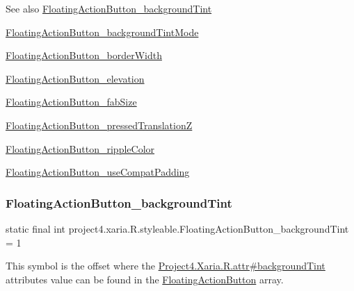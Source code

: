 \begin{DoxySeeAlso}{See also}
\hyperlink{classproject4_1_1xaria_1_1R_1_1styleable_ab51ba534c762989e0a01ee546e7b38ce}{Floating\+Action\+Button\+\_\+background\+Tint} 

\hyperlink{classproject4_1_1xaria_1_1R_1_1styleable_ad842e522e53bfbbcc8e47812cbc7d296}{Floating\+Action\+Button\+\_\+background\+Tint\+Mode} 

\hyperlink{classproject4_1_1xaria_1_1R_1_1styleable_a670df91ac65db7bb060f28a69c8c2ce1}{Floating\+Action\+Button\+\_\+border\+Width} 

\hyperlink{classproject4_1_1xaria_1_1R_1_1styleable_a1f212346344f0518ba9f7671202beaf7}{Floating\+Action\+Button\+\_\+elevation} 

\hyperlink{classproject4_1_1xaria_1_1R_1_1styleable_a7a8737e325d68750ce13b2e494dd1c65}{Floating\+Action\+Button\+\_\+fab\+Size} 

\hyperlink{classproject4_1_1xaria_1_1R_1_1styleable_a0017ae9170f65572e5d8c6c4077e3a32}{Floating\+Action\+Button\+\_\+pressed\+TranslationZ} 

\hyperlink{classproject4_1_1xaria_1_1R_1_1styleable_a74c9af162dc277de265d5a2e6fbcbe9e}{Floating\+Action\+Button\+\_\+ripple\+Color} 

\hyperlink{classproject4_1_1xaria_1_1R_1_1styleable_a234a6a0e94e66106e7873eb4647e1fcb}{Floating\+Action\+Button\+\_\+use\+Compat\+Padding} 
\end{DoxySeeAlso}
\mbox{\label{classproject4_1_1xaria_1_1R_1_1styleable_ab51ba534c762989e0a01ee546e7b38ce}} 
\subsubsection{\texorpdfstring{Floating\+Action\+Button\+\_\+background\+Tint}{FloatingActionButton\_backgroundTint}}
{\footnotesize\ttfamily static final int project4.\+xaria.\+R.\+styleable.\+Floating\+Action\+Button\+\_\+background\+Tint = 1\hspace{0.3cm}{\ttfamily [static]}}

This symbol is the offset where the \hyperlink{}{Project4.\+Xaria.\+R.\+attr\#background\+Tint} attribute\textquotesingle{}s value can be found in the \hyperlink{classproject4_1_1xaria_1_1R_1_1styleable_afccbd80ac1ce5fd6f7a9ee0a1b546322}{Floating\+Action\+Button} array.

